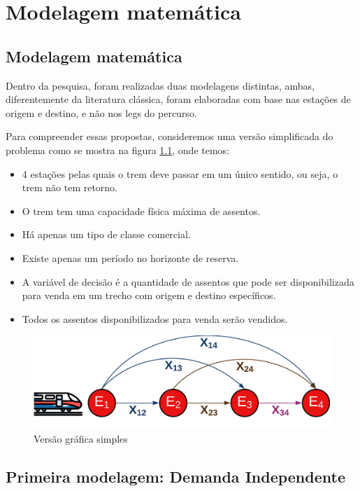 \chapter{Modelagem matemática }

\section{Modelagem matemática}

Dentro da pesquisa, foram realizadas duas modelagens distintas, ambas, diferentemente da literatura clássica, foram elaboradas com base nas estações de origem e destino, e não nos legs do percurso.

Para compreender essas propostas, consideremos uma versão simplificada do problema como se mostra na figura \ref{fig: fig1}, onde temos:

\begin{itemize}
	\item 4 estações pelas quais o trem deve passar em um único sentido, ou seja, o trem não tem retorno.
	\item O trem tem uma capacidade física máxima de assentos.
	\item Há apenas um tipo de classe comercial.
	\item Existe apenas um período no horizonte de reserva.
	\item A variável de decisão é a quantidade de assentos que pode ser disponibilizada para venda em um trecho com origem e destino específicos.
	\item Todos os assentos disponibilizados para venda serão vendidos.
\end{itemize}

\begin{figure}[th]
	\begin{center}
		\includegraphics[scale=0.18]{img/repre_ini1.png}
		\caption{Versão gráfica simples}
		\label{fig: fig1}
	\end{center}
\end{figure}


\section{Primeira modelagem: Demanda Independente}\label{sec:modelo1}

